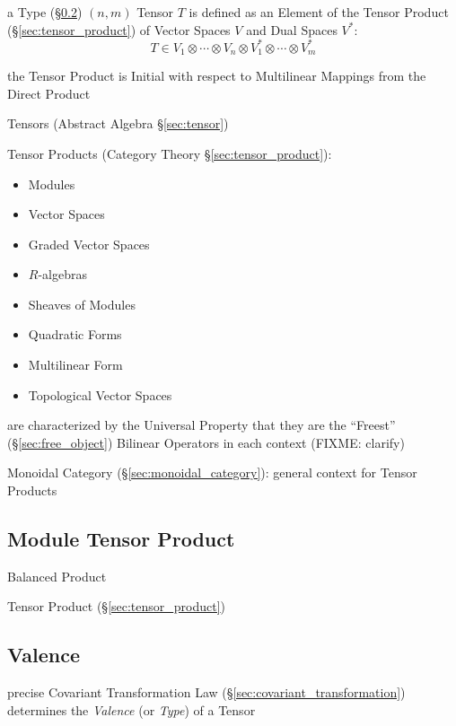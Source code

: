 a Type (\S\ref{sec:valence}) $(n,m)$ Tensor $T$ is defined as an
Element of the Tensor Product (\S\ref{sec:tensor_product}) of Vector
Spaces $V$ and Dual Spaces $V^*$:
\[
  T \in V_1 \otimes \cdots \otimes V_n
    \otimes V^*_1 \otimes \cdots \otimes V^*_m
\]

the Tensor Product is Initial with respect to Multilinear Mappings
from the Direct Product

Tensors (Abstract Algebra \S\ref{sec:tensor})

Tensor Products (Category Theory \S\ref{sec:tensor_product}):
\begin{itemize}
  \item Modules
  \item Vector Spaces
  \item Graded Vector Spaces
  \item $R$-algebras
  \item Sheaves of Modules
  \item Quadratic Forms
  \item Multilinear Form
  \item Topological Vector Spaces
\end{itemize}
are characterized by the Universal Property that they are the ``Freest''
(\S\ref{sec:free_object}) Bilinear Operators in each context
(FIXME: clarify)

Monoidal Category (\S\ref{sec:monoidal_category}): general context for
Tensor Products



\subsection{Module Tensor Product}\label{sec:module_tensor_product}

Balanced Product

\fist Tensor Product (\S\ref{sec:tensor_product})



\subsection{Valence}\label{sec:valence}

precise Covariant Transformation Law
(\S\ref{sec:covariant_transformation}) determines the \emph{Valence}
(or \emph{Type}) of a Tensor

